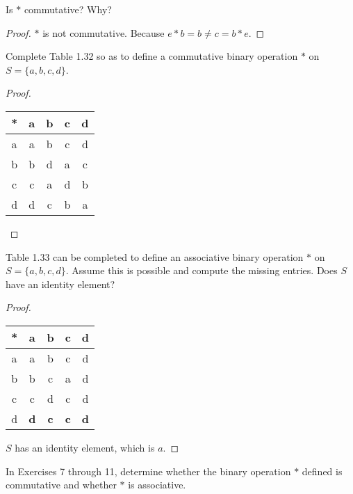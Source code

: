\begin{exercise}
    Is $*$ commutative? Why?
\end{exercise}

\begin{proof}
    $*$ is not commutative. Because $e * b = b \ne c = b * e$.
\end{proof}

\begin{exercise}
    Complete Table 1.32 so as to define a commutative binary operation $*$ on $S = \{ a, b, c, d \}$.
\end{exercise}

\begin{proof}
    \begin{tabular}{c|c|c|c|c}
        * & a & b & c & d \\
        \midrule
        a & a & b & c & d \\
        b & b & d & a & c \\
        c & c & a & d & b \\
        d & d & c & b & a
    \end{tabular}
\end{proof}

\begin{exercise}
    Table 1.33 can be completed to define an associative binary operation $*$ on $S = \{ a, b, c, d \}$. Assume this is possible and compute the missing entries. Does $S$ have an identity element?
\end{exercise}

\begin{proof}
    \begin{tabular}{c|c|c|c|c}
        * & a          & b          & c          & d          \\
        \hline
        a & a          & b          & c          & d          \\
        b & b          & c          & a          & d          \\
        c & c          & d          & c          & d          \\
        d & \textbf{d} & \textbf{c} & \textbf{c} & \textbf{d}
    \end{tabular}

    $S$ has an identity element, which is $a$.
\end{proof}

In Exercises 7 through 11, determine whether the binary operation $*$ defined is commutative and whether $*$ is associative.

